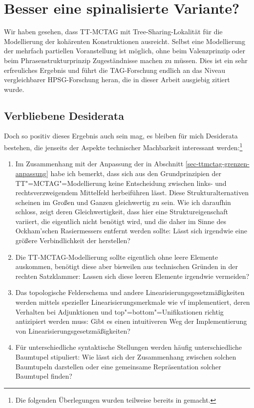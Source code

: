 \section{Besser eine spinalisierte Variante?}\label{sec-ttmctag-spinal}

Wir haben gesehen, dass TT-MCTAG mit Tree-Sharing-Lokalität für die Modellierung der  kohärenten Konstruktionen ausreicht. Selbst eine Modellierung der mehrfach partiellen Voranstellung ist möglich, ohne beim Valenzprinzip oder beim Phrasenstrukturprinzip Zugeständnisse machen zu müssen. Dies ist ein sehr erfreuliches Ergebnis und führt die TAG-Forschung endlich an das Niveau vergleichbarer HPSG-Forschung heran, die in dieser Arbeit ausgiebig zitiert wurde.

\subsection{Verbliebene Desiderata}

Doch so positiv dieses Ergebnis auch sein mag, es bleiben für mich Desiderata bestehen, die jenseits der Aspekte technischer Machbarkeit interessant werden:\footnote{Die folgenden Überlegungen wurden teilweise bereits in \cite{Lichte:10} gemacht.}
\begin{enumerate}\label{enum-ttmctag-spinal}
  \item Im Zusammenhang mit der Anpassung der  in Abschnitt \ref{sec-ttmctag-grenzen-anpassung} habe ich bemerkt, dass sich aus den Grundprinzipien der TT"=MCTAG"=Modellierung keine Entscheidung zwischen links- und rechtsverzweigendem Mittelfeld herbeiführen lässt. Diese Strukturalternativen scheinen im Großen und Ganzen gleichwertig zu sein. Wie ich daraufhin schloss, zeigt deren Gleichwertigkeit, dass hier eine Struktureigenschaft variiert, die eigentlich nicht benötigt wird, und die daher im Sinne des Ockham'schen Rasiermessers entfernt werden sollte: Lässt sich irgendwie eine grö\ss ere Verbindlichkeit der  herstellen?
  \item Die TT-MCTAG-Modellierung sollte eigentlich ohne leere Elemente auskommen, benötigt diese aber bisweilen aus  technischen Gründen in der rechten Satzklammer: Lassen sich diese leeren Elemente irgendwie vermeiden?
  \item Das topologische Felderschema und andere Linearisierungsgesetzmä\ss igkeiten werden mittels spezieller Linearisierungsmerkmale wie {\sc vf} implementiert, deren Verhalten bei Adjunktionen und {\sc top}"={\sc bottom}"=Unifikationen richtig antizipiert werden muss:  Gibt es einen intuitiveren Weg der Implementierung von Linearisierungsgesetzmä\ss igkeiten?
  \item Für unterschiedliche syntaktische Stellungen werden häufig unterschiedliche Baumtupel stipuliert: Wie lässt sich der Zusammenhang zwischen solchen Baumtupeln darstellen oder eine gemeinsame Repräsentation solcher Baumtupel finden? 
\end{enumerate} 


